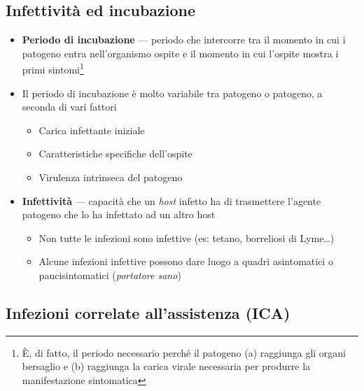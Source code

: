 \documentclass[italian,]{article}
\providecommand{\tightlist}{%
  \setlength{\itemsep}{0pt}\setlength{\parskip}{0pt}}
\begin{document}
\hypertarget{infettivituxe0-ed-incubazione}{%
\subsection*{Infettività ed
incubazione}\label{infettivituxe0-ed-incubazione}}

\begin{itemize}
\tightlist
\item
  \textbf{Periodo di incubazione} --- periodo che intercorre tra il
  momento in cui i patogeno entra nell'organismo ospite e il momento in
  cui l'ospite mostra i primi sintomi\footnote{È, di fatto, il periodo
    necessario perché il patogeno (a) raggiunga gli organi bersaglio e
    (b) raggiunga la carica virale necessaria per produrre la
    manifestazione sintomatica}
\item
  Il periodo di incubazione è molto variabile tra patogeno o patogeno, a
  seconda di vari fattori

  \begin{itemize}
  \tightlist
  \item
    Carica infettante iniziale
  \item
    Caratteristiche specifiche dell'ospite
  \item
    Virulenza intrinseca del patogeno
  \end{itemize}
\item
  \textbf{Infettività} --- capacità che un \emph{host} infetto ha di
  trasmettere l'agente patogeno che lo ha infettato ad un altro host

  \begin{itemize}
  \tightlist
  \item
    Non tutte le infezioni sono infettive (es: tetano, borreliosi di
    Lyme\ldots{})
  \item
    Alcune infezioni infettive possono dare luogo a quadri asintomatici
    o paucisintomatici (\emph{portatore sano})
  \end{itemize}
\end{itemize}

\hypertarget{infezioni-correlate-allassistenza-ica}{%
\subsection*{Infezioni correlate all'assistenza
(ICA)}\label{infezioni-correlate-allassistenza-ica}}
\end{document}
